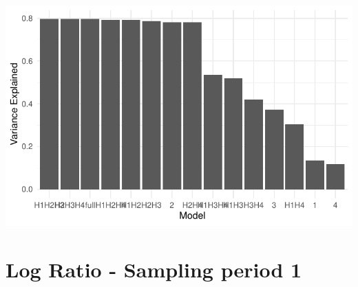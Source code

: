 \documentclass[
  letterpaper,
  DIV=11,
  numbers=noendperiod]{scrreprt}
\begin{document}
\includegraphics{05_VarPart_files/figure-pdf/var-part-ranger-performance-eval-J2-1.pdf}

\section{Log Ratio - Sampling period 1}
\end{document}

